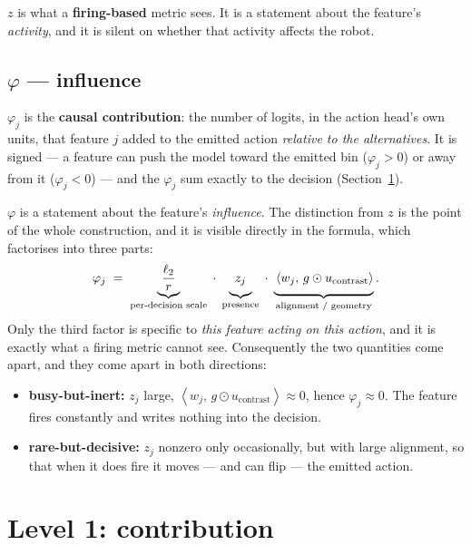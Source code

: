 \documentclass[11pt]{article}
\newcommand{\ip}[2]{\left\langle #1,\, #2 \right\rangle}
\newcommand{\ucon}{u_{\mathrm{contrast}}}
\begin{document}
\medskip
\noindent
$z$ is what a \textbf{firing-based} metric sees. It is a statement about the feature's
\emph{activity}, and it is silent on whether that activity affects the robot.

\subsection{\texorpdfstring{$\varphi$}{phi} --- influence}

$\varphi_j$ is the \textbf{causal contribution}: the number of logits, in the action head's own
units, that feature $j$ added to the emitted action \emph{relative to the alternatives}. It is
signed --- a feature can push the model toward the emitted bin ($\varphi_j>0$) or away from it
($\varphi_j<0$) --- and the $\varphi_j$ sum exactly to the decision (Section~\ref{sec:phi}).

\medskip
\noindent
$\varphi$ is a statement about the feature's \emph{influence}. The distinction from $z$ is the
point of the whole construction, and it is visible directly in the formula, which factorises
into three parts:
\begin{equation}
\varphi_j \;=\;
\underbrace{\frac{\ell_2}{r}}_{\text{per-decision scale}}
\;\cdot\;
\underbrace{\vphantom{\frac{\ell_2}{r}} z_j}_{\text{presence}}
\;\cdot\;
\underbrace{\vphantom{\frac{\ell_2}{r}} \ip{w_j}{g \odot \ucon}}_{\text{alignment / geometry}} .
\label{eq:phi}
\end{equation}
Only the third factor is specific to \emph{this feature acting on this action}, and it is
exactly what a firing metric cannot see. Consequently the two quantities come apart, and they
come apart in both directions:
\begin{itemize}
\item \textbf{busy-but-inert:} $z_j$ large, $\ip{w_j}{g\odot\ucon}\approx 0$, hence
      $\varphi_j\approx 0$. The feature fires constantly and writes nothing into the decision.
\item \textbf{rare-but-decisive:} $z_j$ nonzero only occasionally, but with large alignment,
      so that when it does fire it moves --- and can flip --- the emitted action.
\end{itemize}

\section{Level 1: contribution}
\label{sec:phi}
\end{document}
